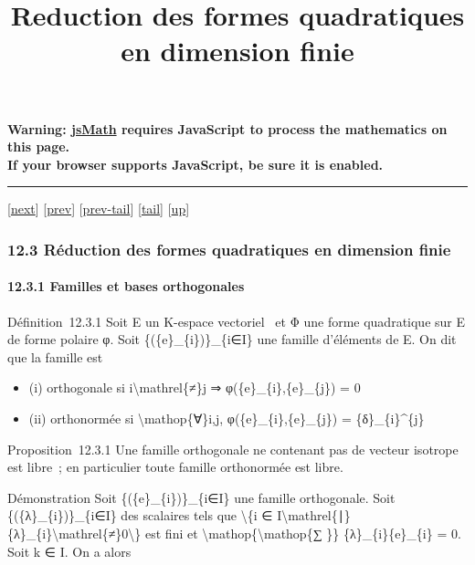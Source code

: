 \documentclass[]{article}
\title{Reduction des formes quadratiques en dimension finie}
\author{}
\date{}
\begin{document}
\maketitle

\textbf{Warning: \href{http://www.math.union.edu/locate/jsMath}{jsMath}
requires JavaScript to process the mathematics on this page.\\ If your
browser supports JavaScript, be sure it is enabled.}

\begin{center}\rule{3in}{0.4pt}\end{center}

{[}\href{coursse70.html}{next}{]} {[}\href{coursse68.html}{prev}{]}
{[}\href{coursse68.html\#tailcoursse68.html}{prev-tail}{]}
{[}\hyperref[tailcoursse69.html]{tail}{]}
{[}\href{coursch13.html\#coursse69.html}{up}{]}

\subsubsection{12.3 Réduction des formes quadratiques en dimension
finie}

\paragraph{12.3.1 Familles et bases orthogonales}

Définition~12.3.1 Soit E un K-espace vectoriel ~et Φ une forme
quadratique sur E de forme polaire φ. Soit \{(\{e\}\_\{i\})\}\_\{i∈I\}
une famille d'éléments de E. On dit que la famille est

\begin{itemize}
\itemsep1pt\parskip0pt
\item
  (i) orthogonale si i\textbackslash{}mathrel\{≠\}j ⇒
  φ(\{e\}\_\{i\},\{e\}\_\{j\}) = 0
\item
  (ii) orthonormée si \textbackslash{}mathop\{∀\}i,j,
  φ(\{e\}\_\{i\},\{e\}\_\{j\}) = \{δ\}\_\{i\}\^{}\{j\}
\end{itemize}

Proposition~12.3.1 Une famille orthogonale ne contenant pas de vecteur
isotrope est libre~; en particulier toute famille orthonormée est libre.

Démonstration Soit \{(\{e\}\_\{i\})\}\_\{i∈I\} une famille orthogonale.
Soit \{(\{λ\}\_\{i\})\}\_\{i∈I\} des scalaires tels que
\textbackslash{}\{i ∈
I\textbackslash{}mathrel\{∣\}\{λ\}\_\{i\}\textbackslash{}mathrel\{≠\}0\textbackslash{}\}
est fini et \textbackslash{}mathop\{\textbackslash{}mathop\{∑ \}\}
\{λ\}\_\{i\}\{e\}\_\{i\} = 0. Soit k ∈ I. On a alors
\end{document}
